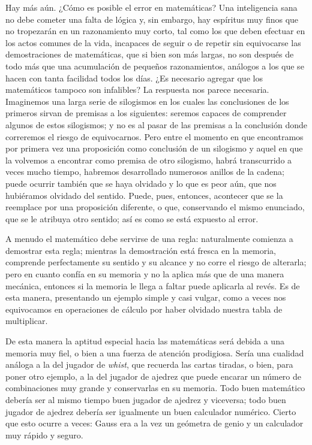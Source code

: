 \documentclass[a4paper, 12pt, draft]{article}
\begin{document}
Hay más aún. ¿Cómo es posible el error en matemáticas? Una
inteligencia sana no debe cometer una falta de lógica y, sin embargo,
hay espíritus muy finos que no tropezarán en un razonamiento muy
corto, tal como los que deben efectuar en los actos comunes de la vida,
incapaces de seguir o de repetir sin equivocarse las demostraciones de matemáticas, que si bien son más largas, no son después de todo más que una acumulación de pequeños razonamientos, análogos a los
que se hacen con tanta facilidad todos los días. ¿Es necesario agregar
que los matemáticos tampoco son infalibles? La respuesta nos parece
necesaria. Imaginemos una larga serie de silogismos en los cuales las
conclusiones de los primeros sirvan de premisas a los siguientes: seremos
capaces de comprender algunos de estos silogismos; y no es al pasar de las
premisas a la conclusión donde correremos el riesgo de equivocarnos.
Pero entre el momento en que encontramos por primera vez una proposición
como conclusión de un silogismo y aquel en que la volvemos a encontrar
como premisa de otro silogismo, habrá transcurrido a veces mucho
tiempo, habremos desarrollado numerosos anillos de la cadena; puede ocurrir
también que se haya olvidado y lo que es peor aún, que nos hubiéramos olvidado del sentido. Puede, pues, entonces, acontecer que se la
reemplace por una proposición diferente, o que, conservando el mismo
enunciado, que se le atribuya otro sentido; así es como se está
expuesto al error.

A menudo el matemático debe servirse de una regla: naturalmente comienza
a demostrar esta regla; mientras la demostración está fresca en la
memoria, comprende perfectamente su sentido y su alcance y no corre el
riesgo de alterarla; pero en cuanto confía en su memoria y no la
aplica más que de una manera mecánica, entonces si la memoria le
llega a faltar puede aplicarla al revés. Es de esta manera,
presentando un ejemplo simple y casi vulgar, como a veces nos
equivocamos en operaciones de cálculo por haber olvidado nuestra tabla
de multiplicar.

De esta manera la aptitud especial hacia las matemáticas será debida
a una memoria muy fiel, o bien a una fuerza de atención prodigiosa. Sería una cualidad análoga a la del jugador de {\it whist}, que recuerda las
cartas tiradas, o bien, para poner otro ejemplo, a la del jugador de ajedrez
que puede encarar un número de combinaciones muy grande y conservarlas
en su memoria. Todo buen matemático debería ser al mismo tiempo
buen jugador de ajedrez y viceversa; todo buen jugador de ajedrez debería ser igualmente un buen calculador numérico. Cierto que esto
ocurre a veces: Gauss era a la vez un geómetra de genio y un calculador
muy rápido y seguro.
\end{document}
